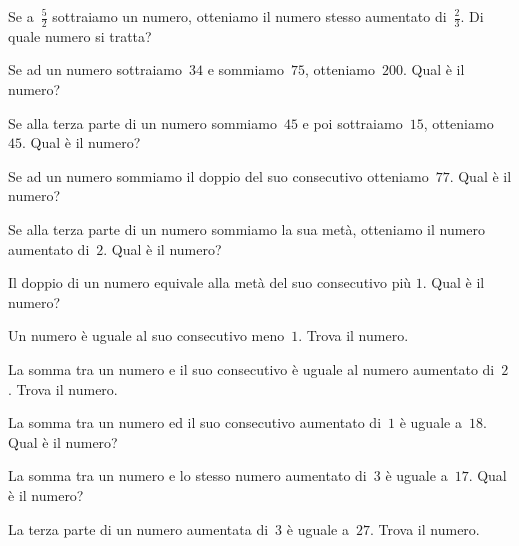 \begin{multicols}{2}
\begin{esercizio}[\Ast]
Se a~$\frac{5}{2}$ sottraiamo un numero, otteniamo il numero stesso aumentato di~$\frac{2}{3}$. Di quale numero si tratta?
\end{esercizio}

\begin{esercizio}[\Ast]
Se ad un numero sottraiamo~$34$ e sommiamo~$75$, otteniamo~$200$. Qual è il numero?
\end{esercizio}

\begin{esercizio}[\Ast]
Se alla terza parte di un numero sommiamo~$45$ e poi sottraiamo~$15$, otteniamo~$45$. Qual è il numero?
\end{esercizio}

\begin{esercizio}[\Ast]
Se ad un numero sommiamo il doppio del suo consecutivo otteniamo~$77$. Qual è il numero?
\end{esercizio}

\begin{esercizio}[\Ast]
Se alla terza parte di un numero sommiamo la sua metà, otteniamo il numero aumentato di~$2$. Qual è il numero?
\end{esercizio}

\begin{esercizio}[\Ast]
Il doppio di un numero equivale alla metà del suo consecutivo più $1$. Qual è il numero?
\end{esercizio}

\begin{esercizio}[\Ast]
Un numero è uguale al suo consecutivo meno~$1$. Trova il numero.
\end{esercizio}

\begin{esercizio}[\Ast]
La somma tra un numero e il suo consecutivo è uguale al numero aumentato di~$2$. Trova il numero.
\end{esercizio}

\begin{esercizio}[\Ast]
La somma tra un numero ed il suo consecutivo aumentato di~$1$ è uguale a~$18$. Qual è il numero?
\end{esercizio}

\begin{esercizio}
La somma tra un numero e lo stesso numero aumentato di~$3$ è uguale a~$17$. Qual è il numero?
\end{esercizio}

\begin{esercizio}[\Ast]
La terza parte di un numero aumentata di~$3$ è uguale a~$27$. Trova il numero.
\end{esercizio}


\end{multicols}
